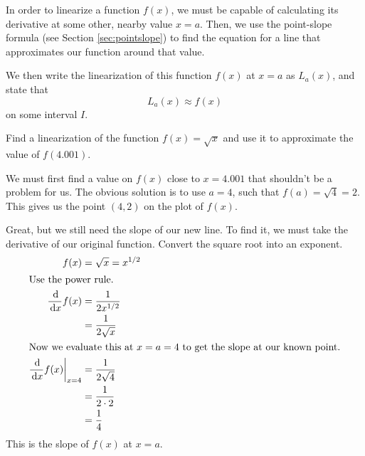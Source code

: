 In order to linearize a function $f(x)$, we must be capable of calculating its derivative at some other, nearby value $x=a$.
Then, we use the point-slope formula (see Section \ref{sec:pointslope}) to find the equation for a line that approximates our function around that value.

We then write the linearization of this function $f(x)$ at $x=a$ as $L_a (x)$, and state that
\[ L_a (x) \approx f(x) \]
on some interval $I$.

\begin{ex}
  Find a linearization of the function $f(x)=\sqrt{x}$ and use it to approximate the value of $f(4.001)$.
  \begin{sol}
    We must first find a value on $f(x)$ close to $x=4.001$ that shouldn't be a problem for us.
    The obvious solution is to use $a=4$, such that $f(a)=\sqrt{4}=2$.
    This gives us the point $(4, 2)$ on the plot of $f(x)$.

    Great, but we still need the slope of our new line.
    To find it, we must take the derivative of our original function.
    Convert the square root into an exponent.
    \begin{align*}
      f(x) &= \sqrt{x} = x^{1/2} \\
      \intertext{Use the power rule.}
      \frac{\,\mathrm{d}}{\,\mathrm{d} x} f(x) &= \frac{1}{2x^{1/2}} \\
      &= \frac{1}{2\sqrt x} \\
      \intertext{Now we evaluate this at $x=a=4$ to get the slope at our known point.}
      \frac{\,\mathrm{d}}{\,\mathrm{d} x} f(x) \bigg|_{x=4}&= \frac{1}{2\sqrt{4}} \\
      &= \frac{1}{2\cdot 2} \\
      &= \frac{1}{4}
    \end{align*}
    This is the slope of $f(x)$ at $x=a$.


\end{sol}
\end{ex}
